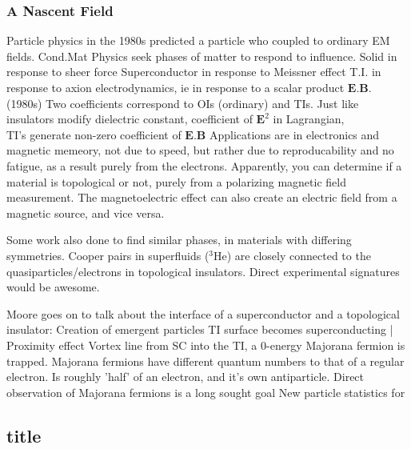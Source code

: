 \documentclass{article} %
\begin{document}
	\subsubsection{A Nascent Field}
	\begin{outline}
		\1 Particle physics in the 1980s predicted a particle who coupled to ordinary EM fields.
		\1 Cond.Mat Physics seek phases of matter to respond to influence. 
			\2 Solid in response to sheer force
			\2 Superconductor in response to Meissner effect
			\2 T.I. in response to axion electrodynamics, ie in response to a scalar product $\textbf{E}.\textbf{B}$. (1980s)
				\3 Two coefficients correspond to OIs (ordinary) and TIs.
		\1 Just like insulators modify dielectric constant, coefficient of $\textbf{E}^2$ in Lagrangian, \\TI's generate non-zero coefficient of $\textbf{E.B}$
		\1 Applications are in electronics and magnetic memeory, not due to speed, but rather due to reproducability and no fatigue, as a result purely from the electrons.
		\1 Apparently, you can determine if a material is topological or not, purely from a polarizing magnetic field measurement.
		\1 The magnetoelectric effect can also create an electric field from a magnetic source, and vice versa. 
		
		\1 Some work also done to find similar phases, in materials with differing symmetries. Cooper pairs in superfluids ($^3$He) are closely connected to the quasiparticles/electrons in topological insulators. Direct experimental signatures would be awesome.
		
		\1 Moore goes on to talk about the interface of a superconductor and a topological insulator:
			\2 Creation of emergent particles
			\2 TI surface becomes superconducting | Proximity effect
				\3 Vortex line from SC into the TI, a 0-energy Majorana fermion is trapped.
				\3 Majorana fermions have different quantum numbers to that of a regular electron.
				\3 Is roughly 'half' of an electron,  and it's own antiparticle.
			\2 Direct observation of Majorana fermions is a long sought goal
			\2 New particle statistics for 
	\end{outline}

\subsection{title}




\end{document}
